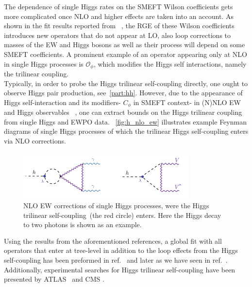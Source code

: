 The dependence of single Higgs rates on the SMEFT Wilson coefficients gets more complicated once NLO and higher effects are taken into an account. As shown in the fit results reported from ~\cite{Dawson:2020oco}, the RGE of these Wilson coefficients introduces new operators that do not appear at LO, also loop corrections to masses of the EW and Higgs bosons as well as their process will depend on some SMEFT coefficients. A prominent example of an operator appearing only at NLO in single Higgs processes is $\mathcal O_\phi$, which modifies the Higgs self interactions, namely the trilinear coupling. \\
Typically, in order to probe the Higgs trilinear self-coupling directly, one ought to observe Higgs pair production, see~\autoref{part:hh}. However, due to the appearance of Higgs self-interaction and its modifiers- $C_\phi$ in SMEFT context-  in (N)NLO EW~\cite{Degrassi:2014sxa,Kribs:2017znd} and Higgs observables~ \cite{McCullough:2013rea, Gorbahn:2016uoy, Degrassi:2016wml, Bizon:2016wgr, Maltoni:2017ims, Degrassi:2019yix, Degrassi:2021uik, Haisch:2021hvy}, one can extract bounds on the Higgs trilinear coupling from single Higgs and EWPO data. ~\autoref{fig:h_nlo_ew} illustrates  example Feynman diagrams of single Higgs processes of which the trilinear Higgs self-coupling enters via NLO corrections.
\begin{figure}[htpb!]
	\begin{center}
		\includegraphics[width=0.8\textwidth]{figures/htoaa_nlo_ew}
		\caption{NLO EW corrections of single Higgs processes,  were the Higgs trilinear self-coupling~(the red circle) enters. Here the Higgs decay to two photons is shown as an example. \label{fig:h_nlo_ew} }
	\end{center}
\end{figure}
Using the results from the aforementioned references, a global fit with all operators that enter at tree-level in addition to the loop effects from the Higgs self-coupling has been preformed in ref.~ \cite{DiVita:2017eyz} and later as we have seen in ref.~\cite{Dawson:2020oco}. Additionally, experimental searches for Higgs trilinear self-coupling have been presented by ATLAS~\cite{ATLAS:2019pbo} and CMS \cite{CMS:2020gsy}. 
